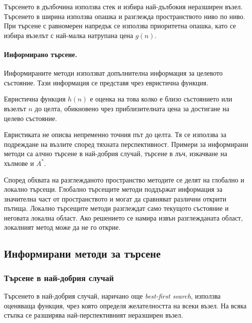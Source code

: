 Търсенето в дълбочина използва стек и избира най-дълбокия неразширен възел. Търсенето в ширина използва опашка и разглежда пространството ниво по ниво. При търсене с равномерен напредък се използва приоритетна опашка, като се избира възелът с най-малка натрупана цена $g(n)$.

\paragraph{Информирано търсене.}
Информираните методи използват допълнителна информация за целевото състояние. Тази информация се представя чрез евристична функция.

\begin{defn}
Евристична функция $h(n)$ е оценка на това колко е близо състоянието или възелът $n$ до целта, обикновено чрез приблизителната цена за достигане на целево състояние.
\end{defn}

Евристиката не описва непременно точния път до целта. Тя се използва за подреждане на възлите според тяхната перспективност. Примери за информирани методи са алчно търсене в най-добрия случай, търсене в лъч, изкачване на хълмове и $A^*$.

Според обхвата на разглежданото пространство методите се делят на глобално и локално търсещи. Глобално търсещите методи поддържат информация за значителна част от пространството и могат да сравняват различни открити пътища. Локално търсещите методи разглеждат само текущото състояние и неговата локална област. Ако решението се намира извън разглежданата област, локалният метод може да не го открие.

\subsection{Информирани методи за търсене}\label{s:25.1.3}

\subsubsection{Търсене в най-добрия случай}

\begin{defn}
Търсенето в най-добрия случай, наричано още \emph{best-first search}, използва оценяваща функция, чрез която определя желателността на всеки възел. На всяка стъпка се разширява най-перспективният неразширен възел.
\end{defn}

